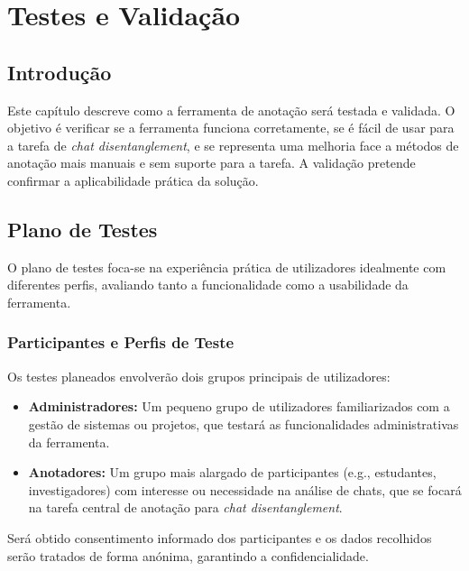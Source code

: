 \chapter{Testes e Validação}

\section{Introdução}

Este capítulo descreve como a ferramenta de anotação será testada e validada. O objetivo é verificar se a ferramenta funciona corretamente, se é fácil de usar para a tarefa de \textit{chat disentanglement}, e se representa uma melhoria face a métodos de anotação mais manuais e sem suporte para a tarefa. A validação pretende confirmar a aplicabilidade prática da solução.

\section{Plano de Testes}

O plano de testes foca-se na experiência prática de utilizadores idealmente com diferentes perfis, avaliando tanto a funcionalidade como a usabilidade da ferramenta.

\subsection{Participantes e Perfis de Teste}
Os testes planeados envolverão dois grupos principais de utilizadores:
\begin{itemize}
    \item \textbf{Administradores:} Um pequeno grupo de utilizadores familiarizados com a gestão de sistemas ou projetos, que testará as funcionalidades administrativas da ferramenta.
    \item \textbf{Anotadores:} Um grupo mais alargado de participantes (e.g., estudantes, investigadores) com interesse ou necessidade na análise de chats, que se focará na tarefa central de anotação para \textit{chat disentanglement}.
\end{itemize}
Será obtido consentimento informado dos participantes e os dados recolhidos serão tratados de forma anónima, garantindo a confidencialidade.

